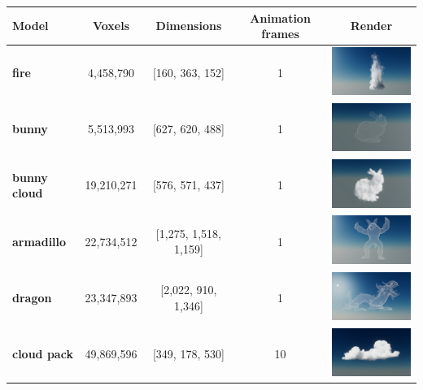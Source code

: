 \begin{table}[htbp]
    \centering 
    \begin{tabularx}{\textwidth}{|X|c|c|c|c|}
    \hline
    \textbf{Model} & \textbf{Voxels} & \textbf{Dimensions} & \textbf{Animation frames} & \textbf{Render}\\
    \hline
    \textbf{fire} & 4,458,790 & [160, 363, 152] & 1 & \includegraphics[width=4cm]{figures/fire.png}\\
    \hline
    \textbf{bunny} & 5,513,993 & [627, 620, 488] & 1 & \includegraphics[width=4cm]{figures/bunny.png}\\
    \hline
    \textbf{bunny cloud} & 19,210,271 & [576, 571, 437] & 1 & \includegraphics[width=4cm]{figures/bunny cloud.png}\\
    \hline
    \textbf{armadillo} & 22,734,512 & [1,275, 1,518, 1,159] & 1 & \includegraphics[width=4cm]{figures/armadilo.png}\\
    \hline
    \textbf{dragon} & 23,347,893 & [2,022, 910, 1,346] & 1 & \includegraphics[width=4cm]{figures/dragon.png}\\
    \hline
    \textbf{cloud pack} & 49,869,596 & [349, 178, 530] & 10 & \includegraphics[width=4cm]{figures/cloud pack.png}\\

\end{tabularx}
\end{table}
